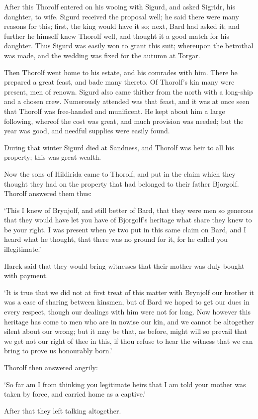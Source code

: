 After this Thorolf entered on his wooing with Sigurd, and asked Sigridr, his daughter, to wife. Sigurd received the proposal well; he said there were many reasons for this; first, the king would have it so; next, Bard had asked it; and further he himself knew Thorolf well, and thought it a good match for his daughter. Thus Sigurd was easily won to grant this suit; whereupon the betrothal was made, and the wedding was fixed for the autumn at Torgar.

Then Thorolf went home to his estate, and his comrades with him. There he prepared a great feast, and bade many thereto. Of Thorolf's kin many were present, men of renown. Sigurd also came thither from the north with a long-ship and a chosen crew. Numerously attended was that feast, and it was at once seen that Thorolf was free-handed and munificent. He kept about him a large following, whereof the cost was great, and much provision was needed; but the year was good, and needful supplies were easily found.

During that winter Sigurd died at Sandness, and Thorolf was heir to all his property; this was great wealth.

Now the sons of Hildirida came to Thorolf, and put in the claim which they thought they had on the property that had belonged to their father Bjorgolf. Thorolf answered them thus:

`This I knew of Brynjolf, and still better of Bard, that they were men so generous that they would have let you have of Bjorgolf's heritage what share they knew to be your right. I was present when ye two put in this same claim on Bard, and I heard what he thought, that there was no ground for it, for he called you illegitimate.'

Harek said that they would bring witnesses that their mother was duly bought with payment.

`It is true that we did not at first treat of this matter with Brynjolf our brother it was a case of sharing between kinsmen, but of Bard we hoped to get our dues in every respect, though our dealings with him were not for long. Now however this heritage has come to men who are in nowise our kin, and we cannot be altogether silent about our wrong; but it may be that, as before, might will so prevail that we get not our right of thee in this, if thou refuse to hear the witness that we can bring to prove us honourably born.'

Thorolf then answered angrily:

`So far am I from thinking  you legitimate heirs that I am told your mother was taken by force, and carried home as a captive.'

After that they left talking altogether.
